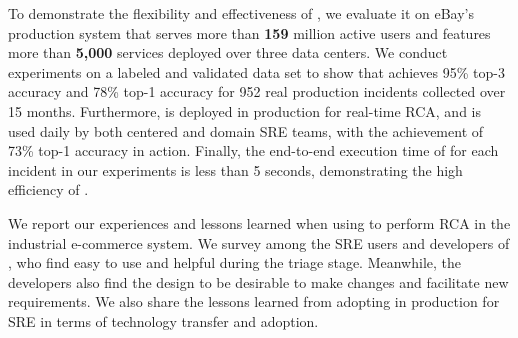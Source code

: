 \begin{itemize}
\end{itemize}

To demonstrate the flexibility and effectiveness of \system, we evaluate it on eBay's production system that serves more than \textbf{159} million active users and features more than \textbf{5,000} services deployed over three data centers. %
We conduct experiments on a labeled and validated data set to show that \system achieves 95\% top-3 accuracy and 78\% top-1 accuracy for 952 real production incidents collected over 15 months. %
Furthermore, \system is deployed in production %
for real-time RCA, and is used daily by both centered and domain SRE teams, with the achievement of 73\% top-1 accuracy in action. 
Finally, the end-to-end execution time of \system for each incident in our experiments is less than 5 seconds, demonstrating the high efficiency of \system.

We report our experiences and lessons learned when using \system to perform RCA in the industrial e-commerce system. We survey among the SRE users and developers of \system, who find \system easy to use and helpful during the triage stage. Meanwhile, the developers also find the \system design to be desirable to make changes and facilitate new requirements. We also share the lessons learned from adopting \system in production for SRE in terms of technology transfer and adoption.

